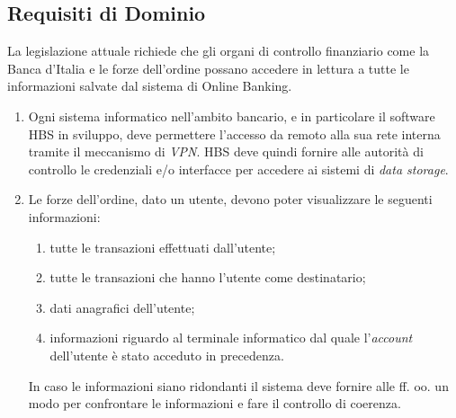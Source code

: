 \subsection{Requisiti di Dominio}
\label{sec:utente:dominio}

La legislazione attuale richiede che gli organi di controllo finanziario come la Banca d'Italia e le forze dell'ordine possano accedere in lettura a tutte le informazioni salvate dal sistema di Online Banking.

\begin{enumerate}
	\item \label{itm:utente:dominio:vpn} Ogni sistema informatico nell'ambito bancario, e in particolare il software HBS in sviluppo, deve permettere l'accesso da remoto alla sua rete interna tramite il meccanismo di \emph{VPN}.
	HBS deve quindi fornire alle autorit\`a di controllo le credenziali e/o interfacce per accedere ai sistemi di \emph{data storage}.

	\item \label{itm:utente:dominio:forze-ordine} Le forze dell'ordine, dato un utente, devono poter visualizzare le seguenti informazioni:
        \begin{enumerate}
           	\item tutte le transazioni effettuati dall'utente;
            \item tutte le transazioni che hanno l'utente come destinatario;
	        \item dati anagrafici dell'utente;
    	    \item informazioni riguardo al terminale informatico dal quale l'\emph{account} dell'utente \`e stato acceduto in precedenza.
		\end{enumerate}
		In caso le informazioni siano ridondanti il sistema deve fornire alle ff. oo. un modo per confrontare le informazioni e fare il controllo di coerenza.


\end{enumerate}
